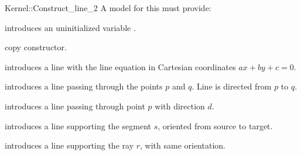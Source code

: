 \begin{ccRefFunctionObjectConcept}{Kernel::Construct_line_2}
A model for this must provide:


\ccHidden {}
             {introduces an uninitialized variable .}

\ccHidden {}
 	    {copy constructor.}

            {introduces a line  with the line equation in Cartesian
	      coordinates $ax +by +c = 0$.}

            {introduces a line  passing through the points $p$ and $q$. 
             Line  is directed from $p$ to $q$.}

            {introduces a line  passing through point $p$ with 
             direction $d$.}

            {introduces a line  supporting the segment $s$,
	    oriented from source to target.}

            {introduces a line  supporting the ray $r$,
	    with same orientation.}

\end{ccRefFunctionObjectConcept}
